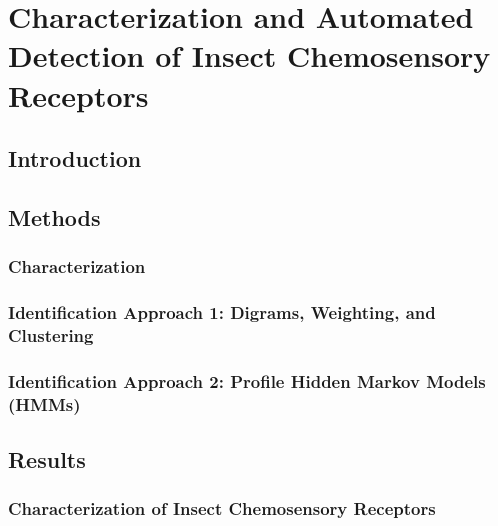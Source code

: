 \section{Characterization and Automated Detection of Insect Chemosensory Receptors}

\subsection{Introduction}

\subsection{Methods}

\subsubsection{Characterization}

\subsubsection{Identification Approach 1: Digrams, Weighting, and Clustering}

\subsubsection{Identification Approach 2: Profile Hidden Markov Models (HMMs)}

\subsection{Results}

\subsubsection{Characterization of Insect Chemosensory Receptors}

